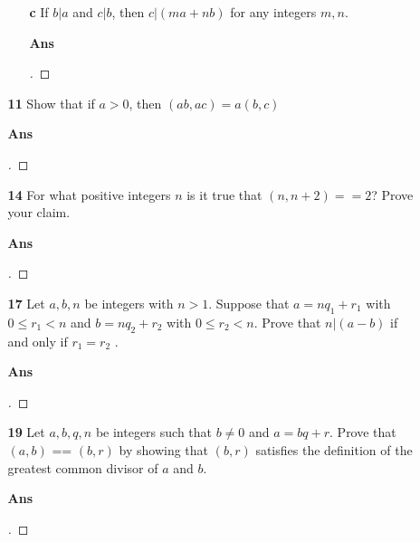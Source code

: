 \documentclass[paper=usletter, fontsize=12pt]{article}
\begin{document}
\begin{itemize}
\begin{itemize}
\begin{itemize}
                    \item[\textbf{c}] If $b | a$ and $c | b$, then $c | (ma +
                    nb)$ for any integers $m, n$.
                    \item[\textbf{Ans}]
                    \begin{proof}[\unskip\nopunct]
                    \end{proof}
                    \vspace{0.2in}

                \end{itemize}

                \item[\textbf{11}] Show that if $a > 0$, then $(ab, ac) = a(b,
                c)$
                \item[\textbf{Ans}]
                \begin{proof}[\unskip\nopunct]
                \end{proof}
                \vspace{0.2in}

                \item[\textbf{14}] For what positive integers $n$ is it true
                that $(n , n + 2) == 2$? Prove your claim.
                \item[\textbf{Ans}]
                \begin{proof}[\unskip\nopunct]
                \end{proof}
                \vspace{0.2in}

                \item[\textbf{17}] Let $a, b, n$ be integers with $n > 1$.
                Suppose that $a = nq_1 + r_1$ with $0 \le r_1 < n$ and $b =
                nq_2 + r_2$ with $0 \le r_2 < n$. Prove that $n | (a - b)$ if
                and only if $r_1 = r_2$ .
                \item[\textbf{Ans}]
                \begin{proof}[\unskip\nopunct]
                \end{proof}
                \vspace{0.2in}

                \item[\textbf{19}] Let $a, b, q, n$ be integers such that $b
                \ne 0$ and $a = bq + r$. Prove that $(a, b)$ == $(b, r)$ by
                showing that $(b, r)$ satisfies the definition of the greatest
                common divisor of $a$ and $b$.
                \item[\textbf{Ans}]
                \begin{proof}[\unskip\nopunct]
                \end{proof}
                \vspace{0.2in}


\end{itemize}
\end{itemize}
\end{document}

